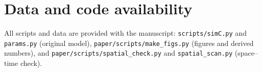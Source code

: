 \documentclass[reprint,amsmath,amssymb,aps,prapplied,superscriptaddress,floatfix]{revtex4-2}
\begin{document}
\section*{Data and code availability}
All scripts and data are provided with the manuscript: \texttt{scripts/simC.py} and \texttt{params.py} (original model), \texttt{paper/scripts/make\_figs.py} (figures and derived numbers), and \texttt{paper/scripts/spatial\_check.py} and \texttt{spatial\_scan.py} (space--time check).


\end{document}

